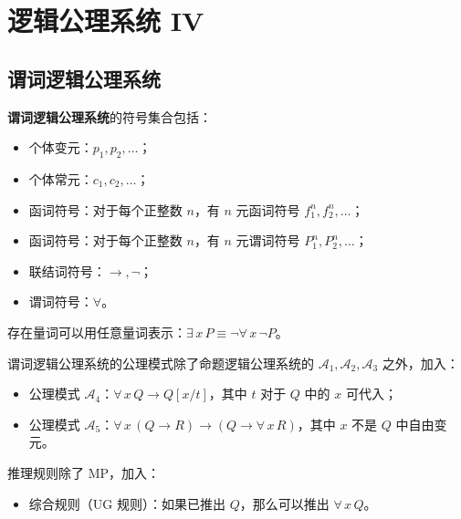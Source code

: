 \section{逻辑公理系统 IV}

\subsection{谓词逻辑公理系统}

\textbf{谓词逻辑公理系统}的符号集合包括：

\begin{itemize}
	\item 个体变元：$p_1, p_2, \dots$；
	\item 个体常元：$c_1, c_2, \dots$；
	\item 函词符号：对于每个正整数 $n$，有 $n$ 元函词符号 $f_1^n, f_2^n, \dots$；
	\item 函词符号：对于每个正整数 $n$，有 $n$ 元谓词符号 $P_1^n, P_2^n, \dots$；
	\item 联结词符号：$\to, \lnot$；
	\item 谓词符号：$\forall$。
\end{itemize}

存在量词可以用任意量词表示：$\exists\,x\,P \equiv \lnot \forall\,x\,\lnot P$。

谓词逻辑公理系统的公理模式除了命题逻辑公理系统的 $\mathscr{A}_1, \mathscr{A}_2, \mathscr{A}_3$ 之外，加入：
\begin{itemize}
	\item 公理模式 $\mathscr{A}_4$：$\forall\,x\,Q \to Q[x / t]$，其中 $t$ 对于 $Q$ 中的 $x$ 可代入；
	\item 公理模式 $\mathscr{A}_5$：$\forall\,x\,(Q \to R) \to (Q \to \forall\,x\,R)$，其中 $x$ 不是 $Q$ 中自由变元。
\end{itemize}

推理规则除了 MP，加入：

\begin{itemize}
	\item 综合规则（UG 规则）：如果已推出 $Q$，那么可以推出 $\forall\,x\,Q$。
\end{itemize}
